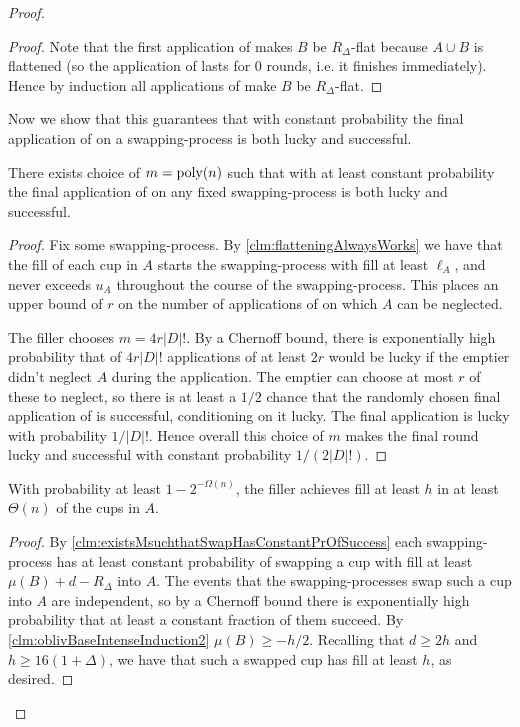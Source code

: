 \begin{proof}
\begin{proof}
  Note that the first application of \flatalg makes $B$ be
  $R_\Delta$-flat because $A\cup B$ is flattened (so the
  application of \flatalg lasts for $0$ rounds, i.e. it finishes
  immediately). 
  Hence by induction all applications of \flatalg make $B$ be
  $R_\Delta$-flat.
\end{proof}

Now we show that this guarantees that with constant probability
the final application of \randalg on a swapping-process is both
lucky and successful. 
\begin{clm}
  \label{clm:existsMsuchthatSwapHasConstantPrOfSuccess}
  There exists choice of $m = \operatorname{\text{poly}}(n)$ such that with at least
  constant probability the final application of \randalg on any
  fixed swapping-process is both lucky and successful.
\end{clm}
\begin{proof}
  Fix some swapping-process. By \cref{clm:flatteningAlwaysWorks}
  we have that the fill of each cup in $A$ starts the
  swapping-process with fill at least $\ell_A$, and never exceeds
  $u_A$ throughout the course of the swapping-process. This
  places an upper bound of $r$ on the number of applications of
  \randalg on which $A$ can be neglected. 

  The filler chooses $m = 4 r |D|!$. By a Chernoff bound, there is
  exponentially high probability that of $4 r |D|!$ applications
  of \randalg at least $2r$ would be lucky if the emptier didn't
  neglect $A$ during the application.
  The emptier can choose at most $r$ of these to neglect, so
  there is at least a $1/2$ chance that the randomly chosen final
  application of \randalg is successful, conditioning on it
  lucky. The final application is lucky with probability
  $1/|D|!$. 
  Hence overall this choice of $m$ makes the final round lucky
  and successful with constant probability $1/(2|D|!)$.
\end{proof}

\begin{clm}
With probability at least $1-2^{-\Omega(n)}$, the filler achieves fill
at least $h$ in at least $\Theta(n)$ of the cups in $A$. 
\end{clm}
\begin{proof}
  By \cref{clm:existsMsuchthatSwapHasConstantPrOfSuccess} each
  swapping-process has at least constant probability of swapping
  a cup with fill at least $\mu(B) + d - R_\Delta$ into $A$. The
  events that the swapping-processes swap such a cup into $A$ are
  independent, so by a Chernoff bound there is exponentially high
  probability that at least a constant fraction of them succeed.
  By \cref{clm:oblivBaseIntenseInduction2} $\mu(B) \ge -h/2$.
  Recalling that $d\ge 2h$ and $h \ge 16(1+\Delta)$, we have that
  such a swapped cup has fill at least $h$, as desired.
\end{proof}


\end{proof}
